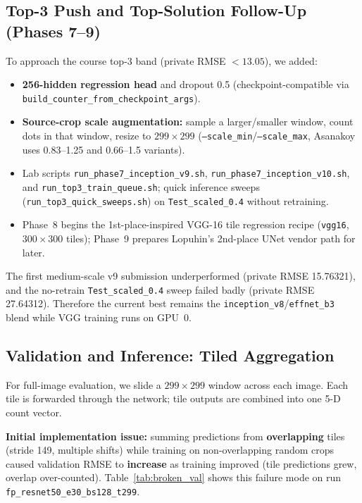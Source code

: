 \documentclass[12pt, a4paper]{article}
\begin{document}
\subsection{Top-3 Push and Top-Solution Follow-Up (Phases 7--9)}
To approach the course top-3 band (private RMSE $<13.05$), we added:
\begin{itemize}
    \item \textbf{256-hidden regression head} and dropout 0.5 (checkpoint-compatible via \texttt{build\_counter\_from\_checkpoint\_args}).
    \item \textbf{Source-crop scale augmentation:} sample a larger/smaller window, count dots in that window, resize to $299\times299$ (\texttt{--scale\_min}/\texttt{--scale\_max}, Asanakoy uses 0.83--1.25 and 0.66--1.5 variants).
    \item Lab scripts \texttt{run\_phase7\_inception\_v9.sh}, \texttt{run\_phase7\_inception\_v10.sh}, and \texttt{run\_top3\_train\_queue.sh}; quick inference sweeps (\texttt{run\_top3\_quick\_sweeps.sh}) on \texttt{Test\_scaled\_0.4} without retraining.
    \item Phase~8 begins the 1st-place-inspired VGG-16 tile regression recipe (\texttt{vgg16}, $300\times300$ tiles); Phase~9 prepares Lopuhin's 2nd-place UNet vendor path for later.
\end{itemize}
The first medium-scale v9 submission underperformed (private RMSE 15.76321), and the no-retrain \texttt{Test\_scaled\_0.4} sweep failed badly (private RMSE 27.64312). Therefore the current best remains the \texttt{inception\_v8}/\texttt{effnet\_b3} blend while VGG training runs on GPU~0.

\subsection{Validation and Inference: Tiled Aggregation}
For full-image evaluation, we slide a $299\times299$ window across each image. Each tile is forwarded through the network; tile outputs are combined into one 5-D count vector.

\textbf{Initial implementation issue:} summing predictions from \textbf{overlapping} tiles (stride 149, multiple shifts) while training on non-overlapping random crops caused validation RMSE to \textbf{increase} as training improved (tile predictions grew, overlap over-counted). Table~\ref{tab:broken_val} shows this failure mode on run \texttt{fp\_resnet50\_e30\_bs128\_t299}.
\end{document}

